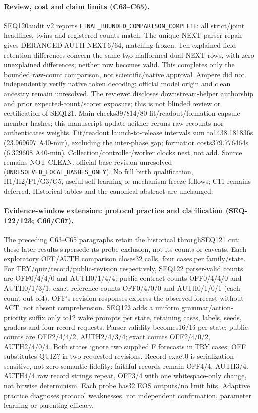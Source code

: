 \documentclass{article}
\begin{document}
\paragraph{Review, cost and claim limits (C63--C65).}
SEQ120audit v2 reports \texttt{FINAL\_BOUNDED\_COMPARISON\_COMPLETE}:
all strict/joint headlines, twins and registered counts match. The unique-NEXT
parser repair gives DERANGED AUTH-NEXT6/64, matching frozen. Ten explained
field-retention differences concern the same two malformed dual-NEXT rows,
with zero unexplained differences; neither row becomes valid. This completes
only the bounded raw-count comparison, not scientific/native approval. Ampere
did not independently verify native token decoding; official model origin and
clean ancestry remain unresolved. The reviewer discloses
downstream-helper authorship and prior
expected-count/scorer exposure; this is not blinded review or certification of
SEQ121. Main checks39/814/80 fit/readout/formation capsule member hashes;
this manuscript update neither reruns raw recounts nor authenticates weights.
Fit/readout launch-to-release intervals sum to1438.181836s (23.969697 A40-min),
excluding the inter-phase gap; formation costs379.776464s (6.329608 A40-min).
Collection/controller/worker clocks nest, not add. Source remains NOT CLEAN,
official base revision unresolved (\texttt{UNRESOLVED\_LOCAL\_HASHES\_ONLY}).
No full birth qualification, H1/H2/P1/G3/G5, useful self-learning or mechanism
freeze follows; C11 remains deferred. Historical tables and the canonical
abstract are unchanged.

\paragraph{Evidence-window extension: protocol practice and clarification (SEQ-122/123; C66/C67).}
The preceding C63--C65 paragraphs retain the historical throughSEQ121 cut;
these later results supersede its probe exclusion, not its counts or caveats.
Each exploratory OFF/AUTH comparison closes32 calls, four cases per family/state.
For TRY/quiz/record/public-revision respectively, SEQ122 parser-valid counts
are OFF0/4/4/0 and AUTH0/1/4/4; public-contract counts OFF0/4/4/0 and AUTH0/1/3/1;
exact-reference counts OFF0/4/0/0 and AUTH0/1/0/1 (each count out of4).
OFF's revision responses express the observed forecast without ACT, not absent
comprehension. SEQ123 adds a uniform grammar/action-priority suffix only to12
wake prompts per state, retaining cases, labels, seeds, graders and four record
requests. Parser validity becomes16/16 per state; public counts are OFF2/4/4/2,
AUTH2/4/3/4; exact counts OFF2/4/0/2, AUTH2/4/0/4. Both states ignore two supplied
F forecasts in TRY cases; OFF substitutes QUIZ? in two requested revisions.
Record exact0 is serialization-sensitive, not zero semantic fidelity: faithful
records remain OFF4/4, AUTH3/4. AUTH4/4 raw record strings repeat, OFF3/4 with
one whitespace-only change, not bitwise determinism. Each probe has32 EOS
outputs/no limit hits. Adaptive practice diagnoses protocol weaknesses, not
independent confirmation, parameter learning or parenting efficacy.
\end{document}
